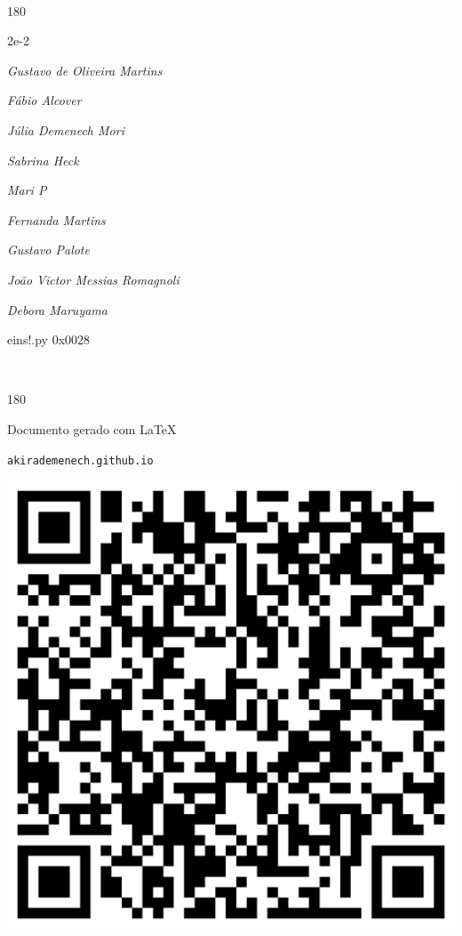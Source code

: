 \documentclass[12pt]{article}
\begin{document}
	\ 
	\vfill
	\begin{turn}{180}	
		\begin{minipage}{\textwidth}
		  	\ttfamily %
			\centering
			{\Huge 2e-2}
		  
			\hfill
		  
			

\textit{\small Gustavo de Oliveira Martins}

\textit{\small Fábio Alcover}

\textit{\small Júlia Demenech Mori}

\textit{\small Sabrina Heck}

\textit{\small Mari P}

\textit{\small Fernanda Martins}

\textit{\small Gustavo Palote}

\textit{\small João Victor Messias Romagnoli}

\textit{\small Debora Maruyama}

\bigskip

eins!.py
0x0028


		\end{minipage}	
	\end{turn}
	\vfill
	\

\pagebreak

	\begin{turn}{180}	
		\begin{minipage}{\textwidth}		  
		  Documento gerado com \LaTeX			
		  
		  \texttt{akirademenech.github.io}

		  \includegraphics[height=0.3\textheight]{2e-2.pdf}

		\end{minipage}	
	\end{turn}  
		  
\end{document}
